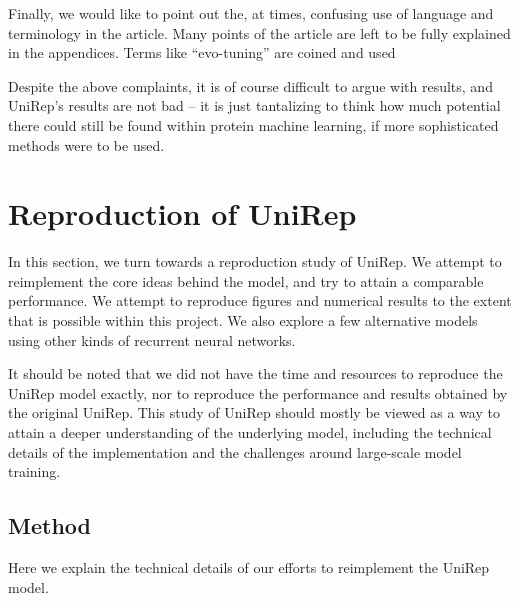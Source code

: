 \documentclass[a4paper,12pt]{article}
\begin{document}
 Finally, we would like to point out the, at times, confusing use of language and terminology in the article. Many points of the article are left to be fully explained in the appendices. Terms like ``evo-tuning'' are coined and used

Despite the above complaints, it is of course difficult to argue with results, and UniRep's results are not bad -- it is just tantalizing to think how much potential there could still be found within protein machine learning, if more sophisticated methods were to be used.






\clearpage
\section{Reproduction of UniRep}
In this section, we turn towards a reproduction study of UniRep. We attempt to reimplement the core ideas behind the model, and try to attain a comparable performance. We attempt to reproduce figures and numerical results to the extent that is possible within this project. We also explore a few alternative models using other kinds of recurrent neural networks.

It should be noted that we did not have the time and resources to reproduce the UniRep model exactly, nor to reproduce the performance and results obtained by the original UniRep. This study of UniRep should mostly be viewed as a way to attain a deeper understanding of the underlying model, including the technical details of the implementation and the challenges around large-scale model training.

\subsection{Method}
Here we explain the technical details of our efforts to reimplement the UniRep model.
\end{document}
